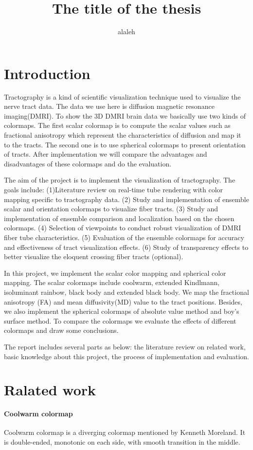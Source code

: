 \documentclass[hyperref, plainreport, noproblem]{cgvpub1}
\author{alaleh}
\title{The title of the thesis}
\begin{document}
\chapter{Introduction}

Tractography is a kind of scientific visualization technique used to visualize the nerve tract data. The data we use here is diffusion magnetic resonance imaging(DMRI). To show the 3D DMRI brain data we basically use two kinds of colormaps. The first scalar colormap is to compute the scalar values such as fractional anisotropy which represent the characteristics of diffusion and map it to the tracts. The second one is to use spherical colormaps to present orientation of tracts. After implementation we will compare the advantages and disadvantages of these colormaps and do the evaluation.

The aim of the project is to implement the visualization of tractography. The goals include: (1)Literature review on real-time tube rendering with color mapping specific to tractography data. (2) Study and implementation of ensemble scalar and orientation colormaps to visualize fiber tracts. (3) Study and implementation of ensemble comparison and localization based on the chosen colormaps. (4) Selection of viewpoints to conduct robust visualization of DMRI fiber tube characteristics. (5) Evaluation of the ensemble colormaps for accuracy and effectiveness of tract visualization effects. (6) Study of transparency effects to better visualize the eloquent crossing fiber tracts (optional).

In this project, we implement the scalar color mapping and spherical color mapping. The scalar colormaps include coolwarm, extended Kindlmann, isoluminant rainbow, black body and extended black body. We map the fractional anisotropy (FA) and mean diffusivity(MD) value to the tract positions. Besides, we also implement the spherical colormaps of absolute value method and boy’s surface method. To compare the colormaps we evaluate the effects of different colormaps and draw some conclusions.

The report includes several parts as below: the literature review on related work, basic knowledge about this project, the process of implementation and evaluation.


\chapter{Ralated work}


\subsubsection*{Coolwarm colormap}
Coolwarm colormap is a diverging colormap mentioned by Kenneth Moreland. It is double-ended, monotonic on each side, with smooth transition in the middle.
\end{document}

